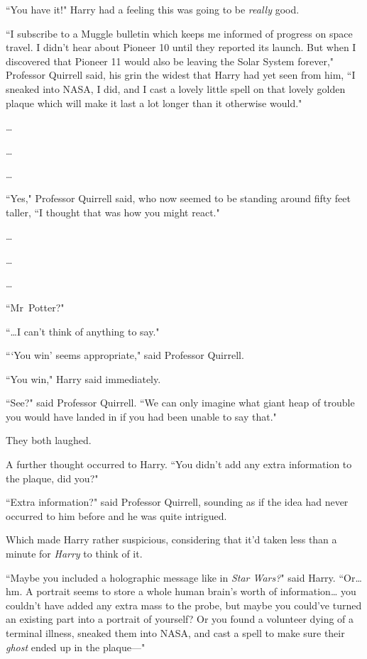 ``You have it!" Harry had a feeling this was going to be \emph{really} good.

``I subscribe to a Muggle bulletin which keeps me informed of progress on space travel. I didn't hear about Pioneer 10 until they reported its launch. But when I discovered that Pioneer 11 would also be leaving the Solar System forever," Professor Quirrell said, his grin the widest that Harry had yet seen from him, ``I sneaked into NASA, I did, and I cast a lovely little spell on that lovely golden plaque which will make it last a lot longer than it otherwise would."

{\ldots}

{\ldots}

{\ldots}

``Yes," Professor Quirrell said, who now seemed to be standing around fifty feet taller, ``I thought that was how you might react."

{\ldots}

{\ldots}

{\ldots}

``Mr~Potter?"

``{\ldots}I can't think of anything to say."

``{}`You win' seems appropriate," said Professor Quirrell.

``You win," Harry said immediately.

``See?" said Professor Quirrell. ``We can only imagine what giant heap of trouble you would have landed in if you had been unable to say that."

They both laughed.

A further thought occurred to Harry. ``You didn't add any extra information to the plaque, did you?"

``Extra information?" said Professor Quirrell, sounding as if the idea had never occurred to him before and he was quite intrigued.

Which made Harry rather suspicious, considering that it'd taken less than a minute for \emph{Harry} to think of it.

``Maybe you included a holographic message like in \emph{Star Wars?}" said Harry. ``Or{\ldots} hm. A portrait seems to store a whole human brain's worth of information{\ldots} you couldn't have added any extra mass to the probe, but maybe you could've turned an existing part into a portrait of yourself? Or you found a volunteer dying of a terminal illness, sneaked them into NASA, and cast a spell to make sure their \emph{ghost} ended up in the plaque—"

